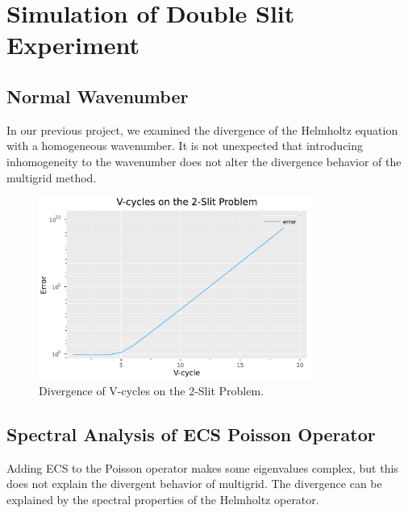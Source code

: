 \documentclass[a4paper,12pt]{article}
\begin{document}
\section{Simulation of Double Slit Experiment}
\subsection{Normal Wavenumber}

In our previous project, we examined the divergence of the Helmholtz equation with a homogeneous wavenumber.
It is not unexpected that introducing inhomogeneity to the wavenumber does not alter the divergence behavior
of the multigrid method.

\begin{figure}[h!]
    \centering
    \includegraphics[width=0.8\textwidth]{../plots/Convergence_of_V-cycles_on_the_2-Slit_Problem.pdf}
    \caption{Divergence of V-cycles on the 2-Slit Problem.}
    \label{fig:Convergence_of_V-cycles_on_the_2-Slit_Problem}
\end{figure}

\subsection{Spectral Analysis of ECS Poisson Operator}
Adding ECS to the Poisson operator makes some eigenvalues complex, but this does not explain the
divergent behavior of multigrid. The divergence can be explained by the spectral properties of the Helmholtz
operator.
\end{document}
